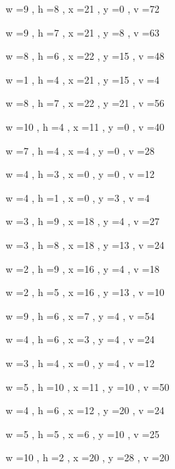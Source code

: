 \documentclass[11pt]{article}
\begin{document}
w =9 , h =8 , x =21 , y =0 , v =72
\par
w =9 , h =7 , x =21 , y =8 , v =63
\par
w =8 , h =6 , x =22 , y =15 , v =48
\par
w =1 , h =4 , x =21 , y =15 , v =4
\par
w =8 , h =7 , x =22 , y =21 , v =56
\par
w =10 , h =4 , x =11 , y =0 , v =40
\par
w =7 , h =4 , x =4 , y =0 , v =28
\par
w =4 , h =3 , x =0 , y =0 , v =12
\par
w =4 , h =1 , x =0 , y =3 , v =4
\par
w =3 , h =9 , x =18 , y =4 , v =27
\par
w =3 , h =8 , x =18 , y =13 , v =24
\par
w =2 , h =9 , x =16 , y =4 , v =18
\par
w =2 , h =5 , x =16 , y =13 , v =10
\par
w =9 , h =6 , x =7 , y =4 , v =54
\par
w =4 , h =6 , x =3 , y =4 , v =24
\par
w =3 , h =4 , x =0 , y =4 , v =12
\par
w =5 , h =10 , x =11 , y =10 , v =50
\par
w =4 , h =6 , x =12 , y =20 , v =24
\par
w =5 , h =5 , x =6 , y =10 , v =25
\par
w =10 , h =2 , x =20 , y =28 , v =20
\par
\newpage
\end{document}
